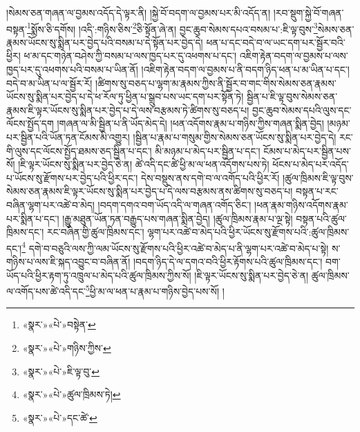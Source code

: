 །སེམས་ཅན་གཞན་ལ་བྱམས་འདོད་དེ་ལྟར་ནི། །སྐྱེ་བོ་བདག་ལ་བྱམས་པར་མི་འདོད་ན། །རབ་སྡུག་སྐྱེ་བོ་གཞན་བསྟན་\footnote{«སྣར་»«པེ་»བསྟེན་}སྨོས་ཅི་དགོས། །འདི་:གཉིས་ཅིས་\footnote{«སྣར་»«པེ་»གཉིས་ཀྱིས་}ཅི་སྟོན་ཞེ་ན། བྱང་ཆུབ་སེམས་དཔའ་བསམ་པ་:ཇི་ལྟ་བུས་\footnote{«སྣར་»«པེ་»ཇི་ལྟ་བུ་}སེམས་ཅན་རྣམས་ཡོངས་སུ་སྨིན་པར་བྱེད་པའི་བསམ་པ་དེ་སྟོན་པར་བྱེད་དེ། ཕན་པ་དང་བདེ་བ་ལ་ཡང་དག་པར་སྦྱོར་བའི་ཕྱིར། ཕ་མ་དང་གཉེན་བཤེས་ཀྱི་བསམ་པ་ལས་ཁྱད་པར་དུ་འཕགས་པ་དང་། འཇིག་རྟེན་བདག་ལ་བྱམས་པ་ལས་ཁྱད་པར་དུ་འཕགས་པའི་བསམ་པ་ཡིན་ནོ། །འཇིག་རྟེན་བདག་ལ་བྱམས་པ་ནི་བདག་ཉིད་ཕན་པ་མ་ཡིན་པ་དང་། བདེ་བ་མ་ཡིན་པ་ལ་སྦྱོར་རོ། །ཚིགས་སུ་བཅད་པ་ལྷག་མ་རྣམས་ཀྱིས་ནི་སྦྱོར་བ་གང་གིས་སེམས་ཅན་རྣམས་ཡོངས་སུ་སྨིན་པར་བྱེད་པ་དེ་ཕ་རོལ་ཏུ་ཕྱིན་པ་སྒྲུབ་པས་ཡང་དག་པར་སྟོན་ཏེ། སྦྱིན་པ་ཇི་ལྟ་བུས་སེམས་ཅན་རྣམས་ཇི་ལྟར་ཡོངས་སུ་སྨིན་པར་བྱེད་པ་དེ་ལས་བརྩམས་ཏེ་ཚིགས་སུ་བཅད་པ། བྱང་ཆུབ་སེམས་དཔའི་ལུས་དང་ལོངས་སྤྱོད་དག །གཞན་ལ་མི་སྦྱིན་པ་ནི་ཡོད་མེད་དེ། །ཕན་འདོགས་རྣམ་པ་གཉིས་ཀྱིས་གཞན་སྨིན་བྱེད། །མཉམ་པར་སྦྱིན་པའི་ཡོན་ཏན་ངོམས་མི་འགྱུར། །སྦྱིན་པ་རྣམ་པ་གསུམ་གྱིས་སེམས་ཅན་ཡོངས་སུ་སྨིན་པར་བྱེད་དེ། རང་གི་ལུས་དང་ལོངས་སྤྱོད་ཐམས་ཅད་སྦྱིན་པ་དང་། མི་མཉམ་པ་མེད་པར་སྦྱིན་པ་དང་། ངོམས་པ་མེད་པར་སྦྱིན་པས་སོ། །ཇི་ལྟར་ཡོངས་སུ་སྨིན་པར་བྱེད་ཅེ་ན། ཚེ་འདི་དང་ཚེ་ཕྱི་མ་ལ་ཕན་འདོགས་པས་ཏེ། ཕོངས་པ་མེད་པར་འདོད་པ་ཡོངས་སུ་རྫོགས་པར་བྱེད་པའི་ཕྱིར་དང་། དེས་བསྡུས་ནས་དགེ་བ་ལ་འགོད་པའི་ཕྱིར་རོ། །ཚུལ་ཁྲིམས་ཇི་ལྟ་བུས་སེམས་ཅན་རྣམས་ཇི་ལྟར་ཡོངས་སུ་སྨིན་པར་བྱེད་པ་དེ་ལས་བརྩམས་ནས་ཚིགས་སུ་བཅད་པ། བསྟན་པ་རང་བཞིན་ལྷག་པར་འཚེ་བ་མེད། །བདག་དགའ་བག་ཡོད་འདི་ལ་གཞན་འགོད་ཅིང་། །ཕན་རྣམ་གཉིས་འདོགས་རྣམ་པར་སྨིན་པ་དང་། །རྒྱུ་མཐུན་ཡོན་ཏན་བརྒྱུད་པས་གཞན་སྨིན་བྱེད། །ཚུལ་ཁྲིམས་རྣམ་པ་ལྔ་སྟེ། བསྟན་པའི་ཚུལ་ཁྲིམས་དང་། རང་བཞིན་གྱི་ཚུལ་ཁྲིམས་དང་། ལྷག་པར་འཚེ་བ་མེད་པའི་ཕྱིར་ཡོངས་སུ་རྫོགས་པའི་:ཚུལ་ཁྲིམས་དང་།\footnote{«སྣར་»«པེ་»ཚུལ་ཁྲིམས་ཏེ།} དགེ་བ་བཅུའི་ལས་ཀྱི་ལམ་ཡོངས་སུ་རྫོགས་པའི་ཕྱིར་འཚེ་བ་མེད་པ་ནི་ལྷག་པར་འཚེ་བ་མེད་པ་སྟེ། ས་གཉིས་པ་ལས་ཇི་སྐད་འབྱུང་བ་བཞིན་ནོ། །བདག་ཉིད་དེ་ལ་དགའ་བའི་ཕྱིར་རྟོགས་པའི་ཚུལ་ཁྲིམས་དང་། བག་ཡོད་པའི་ཕྱིར་རྟག་ཏུ་འཁྲུལ་པ་མེད་པའི་ཚུལ་ཁྲིམས་ཀྱིས་སོ། །ཇི་ལྟར་ཡོངས་སུ་སྨིན་པར་བྱེད་ཅེ་ན། ཚུལ་ཁྲིམས་ལ་འགོད་པས་ཚེ་འདི་དང་\footnote{«སྣར་»«པེ་»དང་ཚེ་}ཕྱི་མ་ལ་ཕན་པ་རྣམ་པ་གཉིས་བྱེད་པས་སོ། །
